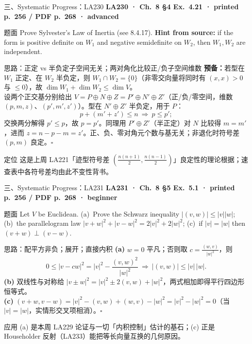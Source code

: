 \documentclass[aspectratio=169,10pt,fontset=none]{ctexbeamer}
\newcommand{\ex}[1]{\textcolor{accent}{\footnotesize\bfseries #1}}
\begin{document}
\begin{frame}[t]{三、Systematic Progress：LA230}
  \leavevmode\ex{LA230 · Ch.~8 §4 Ex.~4.21 · printed p.~256 / PDF p.~268 · advanced}
  \begin{block}{\footnotesize 题面}
    \scriptsize Prove Sylvester's Law of Inertia (see 8.4.17). \textbf{Hint from source:} if the form is positive definite on $W_1$ and negative semidefinite on $W_2$, then $W_1,W_2$ are independent.
  \end{block}
  \begin{exampleblock}{\footnotesize 思路：正定 vs 半负定子空间无关；两对角化比较正/负子空间维数}
    \scriptsize
    \textbf{预备：}若型在 $W_1$ 正定、在 $W_2$ 半负定，则 $W_1\cap W_2=\{0\}$（非零交向量将同时有 $(x,x)>0$ 与 $\le0$），故 $\dim W_1+\dim W_2\le\dim V$。\\
    设两个正交基分别给出 $V=P\oplus N\oplus Z=P'\oplus N'\oplus Z'$（正/负/零空间，维数 $(p,m,z)$、$(p',m',z')$）。型在 $N'\oplus Z'$ 半负定，用于 $P$：
    $$p+(m'+z')\le n\ \Longrightarrow\ p\le p';$$
    交换两分解得 $p'\le p$，故 $p=p'$。同理用 $P'\oplus Z'$（半正定）对 $N$ 比较得 $m=m'$，进而 $z=n-p-m=z'$。正、负、零对角元个数与基无关；非退化时符号差 $(p,m)$ 良定。$\square$
  \end{exampleblock}
  \begin{block}{\footnotesize 定位}
    \scriptsize 这是上周 LA221「迹型符号差 $(\tfrac{n(n+1)}2,\tfrac{n(n-1)}2)$」良定性的理论根据；速查表中各符号差均由此不变性背书。
  \end{block}
\end{frame}

\begin{frame}[t]{三、Systematic Progress：LA231}
  \leavevmode\ex{LA231 · Ch.~8 §5 Ex.~5.1 · printed p.~256 / PDF p.~268 · beginner}
  \begin{block}{\footnotesize 题面}
    \scriptsize Let $V$ be Euclidean. (a)~Prove the Schwarz inequality $|(v,w)|\le|v||w|$; (b)~the parallelogram law $|v+w|^2+|v-w|^2=2|v|^2+2|w|^2$; (c)~if $|v|=|w|$ then $(v+w)\perp(v-w)$.
  \end{block}
  \begin{exampleblock}{\footnotesize 思路：配平方非负；展开；直接内积}
    \scriptsize
    \textbf{(a)} $w=0$ 平凡；否则取 $c=\tfrac{(w,v)}{|w|^2}$，则
    $$0\le|v-cw|^2=|v|^2-\frac{(v,w)^2}{|w|^2}\ \Longrightarrow\ |(v,w)|\le|v|\,|w|.$$
    \textbf{(b)} 双线性与对称给 $|v\pm w|^2=|v|^2\pm2(v,w)+|w|^2$，两式相加即得平行四边形恒等式。\\
    \textbf{(c)} $(v+w,v-w)=|v|^2-(v,w)+(w,v)-|w|^2=|v|^2-|w|^2=0$（当 $|v|=|w|$，实情形交叉项相消）。$\square$
  \end{exampleblock}
  \begin{block}{\footnotesize 应用}
    \scriptsize (a) 是本周 LA229 论证与一切「内积控制」估计的基石；(c) 正是 Householder 反射（LA233）能把等长向量互换的几何原因。
  \end{block}
\end{frame}
\end{document}
